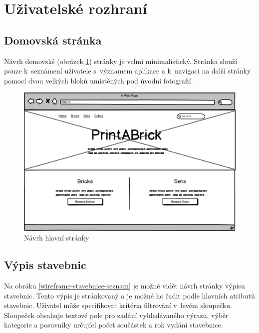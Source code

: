 \section{Uživatelské rozhraní}

\subsection{Domovská stránka}
Návrh domovské (obrázek \ref{wireframe-hlavni}) stránky je velmi minimalistický. Stránka slouží pouze k~seznámení uživatele s~významem aplikace a k~navigaci na další stránky pomocí dvou velkých bloků umístěných pod úvodní fotografií.

\begin{figure}[htbp]
    \centering
    \includegraphics[width=\textwidth,height=\textheight,keepaspectratio]{pdfs/wireframe_home.pdf}
    \caption{Návrh hlavní stránky}\label{wireframe-hlavni}
\end{figure}


\subsection{Výpis stavebnic}
Na obráku \ref{wireframe-stavebnice-seznam} je možné vidět návrh stránky výpisu stavebnic. Tento výpis je stránkovaný a je možné ho řadit podle hlavních atributů stavebnic. Uživatel může specifikovat kritéria filtrování v~levém sloupečku. Sloupeček obsahuje textové pole pro zadání vyhledávaného výrazu, výběr kategorie a posuvníky určující počet součástek a rok vydání stavebnice.

